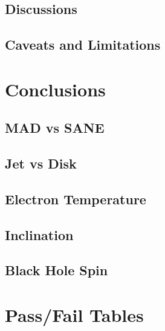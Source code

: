 \documentclass[twocolumn,twocolappendix,tighten,dvipsnames,linenumbers]{aastex63}
\begin{document}
\subsection{Discussions}

\subsection{Caveats and Limitations}

\clearpage

\section{Conclusions}

\subsection{MAD vs SANE}

\subsection{Jet vs Disk}

\subsection{Electron Temperature}

\subsection{Inclination}

\subsection{Black Hole Spin}

\clearpage

 \software{\ehtim, \difmap, \smili, \dmc, \themis, \foci}

\appendix

\section{Pass/Fail Tables}

\clearpage
\end{document}
